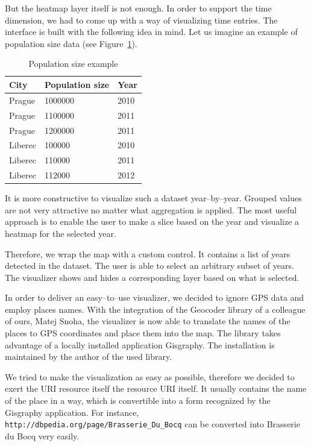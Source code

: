 But the heatmap layer itself is not enough. In order to support the time 
dimension, we had to come up with a way of visualizing time entries. The 
interface is built with the following idea in mind. Let us imagine an example of 
population size data (see Figure~\ref{fig:impl-pop-ex}).

\begin{table}
  \begin{center}
\begin{tabular}{l|l|l}
  City & Population size & Year \\ \hline
  Prague   &    1000000   &   2010 \\
  Prague   &    1100000   &   2011 \\
  Prague   &    1200000   &   2011 \\
  Liberec   &    100000    &  2010 \\
  Liberec   &    110000    &  2011 \\
  Liberec    &   112000    &  2012
\end{tabular}
\caption{Population size example}
\label{fig:impl-pop-ex}
  \end{center}
\end{table}

It is more constructive to visualize such a dataset year--by--year. Grouped values are 
not very attractive no matter what aggregation is applied. The most useful 
approach is to enable the user to make a slice based on the year and visualize a 
heatmap for the selected year.

Therefore, we wrap the map with a custom control. It contains a list of years 
detected in the dataset. The user is able to select an arbitrary subset of 
years. The visualizer shows and hides a corresponding layer based on what is 
selected. 

In order to deliver an easy--to--use visualizer, we decided to ignore GPS 
data and employ places names. With the integration of the Geocoder library of a 
colleague of ours, Matej Snoha, the visualizer is now able to translate the names of 
the places to GPS coordinates and place them into the map. The library takes 
advantage of a locally installed application Gisgraphy. The installation is 
maintained by the author of the used library.

We tried to make the visualization as easy as possible, therefore we decided to exert the
URI resource itself the resource URI itself. It usually contains the name of the place 
in a way, which is convertible into a form recognized by the Gisgraphy 
application. For instance, \texttt{http://dbpedia.org/page/Brasserie\_Du\_Bocq} 
can be converted into Brasserie du Bocq very easily.

